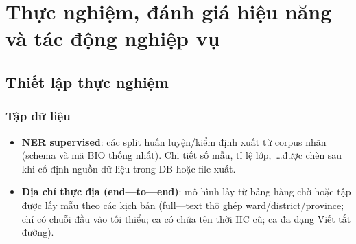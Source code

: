 \chapter{Thực nghiệm, đánh giá hiệu năng và tác động nghiệp vụ}
\label{ch:experiments}




\section{Thiết lập thực nghiệm}
\subsection{Tập dữ liệu}
\begin{itemize}
  \item \textbf{NER supervised}: các split huấn luyện/kiểm định xuất từ corpus nhãn (schema và mã BIO thống nhất). Chi tiết số mẫu, tỉ lệ lớp,~\ldots được chèn sau khi cố định nguồn dữ liệu trong DB hoặc file xuất.
  \item \textbf{Địa chỉ thực địa (end---to---end)}: mô hình lấy từ bảng hàng chờ hoặc tập được lấy mẫu theo các kịch bản (full---text thô ghép ward/district/province; chỉ có chuỗi đầu vào tối thiểu; ca có chứa tên thời HC cũ; ca đa dạng Viết tắt đường).
\end{itemize}

